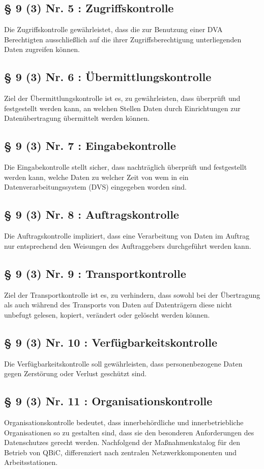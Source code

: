 \documentclass[]{scrreprt}
\begin{document}
\subsection{§ 9 (3) Nr. 5 : Zugriffskontrolle}
Die Zugriffskontrolle gewährleistet, dass die zur Benutzung einer DVA Berechtigten ausschließlich auf die ihrer Zugriffsberechtigung unterliegenden Daten zugreifen können.
\subsection{§ 9 (3) Nr. 6 : Übermittlungskontrolle}
Ziel der Übermittlungskontrolle ist es, zu gewährleisten, dass überprüft und festgestellt werden kann, an welchen Stellen Daten durch Einrichtungen zur Datenübertragung übermittelt werden können.
\subsection{§ 9 (3) Nr. 7 : Eingabekontrolle}
Die Eingabekontrolle stellt sicher, dass nachträglich überprüft und festgestellt werden kann, welche Daten zu welcher Zeit von wem in ein Datenverarbeitungssystem (DVS) eingegeben worden sind.
\subsection{§ 9 (3) Nr. 8 : Auftragskontrolle}
Die Auftragskontrolle impliziert, dass eine Verarbeitung von Daten im Auftrag nur entsprechend den Weisungen des Auftraggebers durchgeführt werden kann.
\subsection{§ 9 (3) Nr. 9 : Transportkontrolle}
Ziel der Transportkontrolle ist es, zu verhindern, dass sowohl bei der Übertragung als auch während des Transports von Daten auf Datenträgern diese nicht unbefugt gelesen, kopiert, verändert oder gelöscht werden können. 
\subsection{§ 9 (3) Nr. 10 : Verfügbarkeitskontrolle}
Die Verfügbarkeitskontrolle soll gewährleisten, dass personenbezogene Daten gegen Zerstörung oder Verlust geschützt sind.
\subsection{§ 9 (3) Nr. 11 : Organisationskontrolle}
Organisationskontrolle bedeutet, dass innerbehördliche und innerbetriebliche Organisationen so zu gestalten sind, dass sie den besonderen Anforderungen des Datenschutzes gerecht werden.
Nachfolgend der Maßnahmenkatalog für den Betrieb von QBiC, differenziert nach zentralen Netzwerkkomponenten und Arbeitsstationen.
\end{document}
